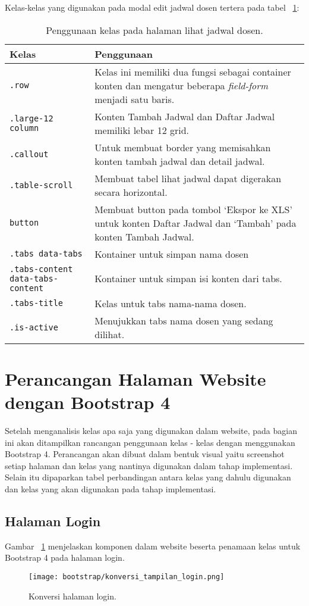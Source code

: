\noindent Kelas-kelas yang digunakan pada modal edit jadwal dosen tertera pada tabel ~\ref{table:analisisLihatJadwalDosen}:
\begin{table}[H]
	\centering
	\caption{Penggunaan kelas pada halaman lihat jadwal dosen.}
	\begin{tabularx}{\textwidth}{lX}
		\toprule
		Kelas     & Penggunaan \\
		\midrule
		\texttt{.row} & Kelas ini memiliki dua fungsi sebagai container konten dan mengatur beberapa \textit{field-form} menjadi satu baris. \\
		\texttt{.large-12 column} & Konten Tambah Jadwal dan Daftar Jadwal memiliki lebar 12 grid.\\
		\texttt{.callout} & Untuk membuat border yang memisahkan konten tambah jadwal dan detail jadwal.\\
		\texttt{.table-scroll} & Membuat tabel lihat jadwal dapat digerakan secara horizontal.\\
		\texttt{button} & Membuat button pada tombol `Ekspor ke XLS' untuk konten Daftar Jadwal dan `Tambah' pada konten Tambah Jadwal.	\\
		\texttt{.tabs data-tabs} & Kontainer untuk simpan nama dosen\\
		\texttt{.tabs-content data-tabs-content} & Kontainer untuk simpan isi konten dari tabs.\\
		\texttt{.tabs-title} & Kelas untuk tabs nama-nama dosen.\\
		\texttt{.is-active} & Menujukkan tabs nama dosen yang sedang dilihat.\\
		\bottomrule
	\end{tabularx}%
	\label{table:analisisLihatJadwalDosen}
\end{table}

\section{Perancangan Halaman Website dengan Bootstrap 4}
Setelah menganalisis kelas apa saja yang digunakan dalam website, pada bagian ini akan ditampilkan rancangan penggunaan kelas - kelas dengan menggunakan Bootstrap 4. Perancangan akan dibuat dalam bentuk visual yaitu screenshot setiap halaman dan kelas yang nantinya digunakan dalam tahap implementasi. Selain itu dipaparkan tabel perbandingan antara kelas yang dahulu digunakan dan kelas yang akan digunakan pada tahap implementasi.\\
\subsection{Halaman Login}
\noindent Gambar ~\ref{fig:konversiLogin} menjelaskan komponen dalam website beserta penamaan kelas untuk Bootstrap 4 pada halaman login.\\
\begin{figure} [H]
	\centering  
	\texttt{[image: bootstrap/konversi\_tampilan\_login.png]}  
	\caption{Konversi halaman login.} 
	\label{fig:konversiLogin}
\end{figure} \noindent \\

